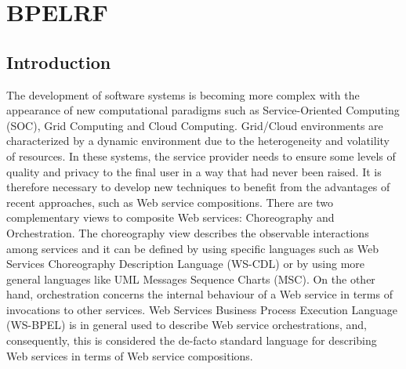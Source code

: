 \chapter{BPELRF}\label{chapter:c3}
%
%
\section{Introduction}
The development of software systems is becoming more complex with the 
appearance
of new computational paradigms such as Service-Oriented  Computing  (SOC), 
Grid Computing and Cloud Computing. Grid/Cloud environments are characterized by a dynamic environment due to the heterogeneity and volatility of resources. In these systems, the service provider needs to ensure some levels of 
quality and privacy to the final
user in a way that had never been raised. It is therefore necessary to develop new techniques to benefit from the advantages 
of recent approaches, such as Web service compositions. %
 There are two complementary views to composite Web services: Choreography and Orchestration. The choreography view describes the observable interactions among services and it can
be  defined  by  using  specific  languages such as Web  Services
Choreography  Description  Language  (WS-CDL) %
or  by using more general languages like UML Messages Sequence
Charts (MSC). On the other hand, orchestration concerns
the internal behaviour of a Web service in terms of invocations
to  other  services.  Web Services Business Process Execution Language (WS-BPEL) \cite{BPEL4WS} is in general used 
to describe Web service orchestrations, and, consequently, this
is considered the de-facto standard language for describing Web services
in terms of Web service compositions.


